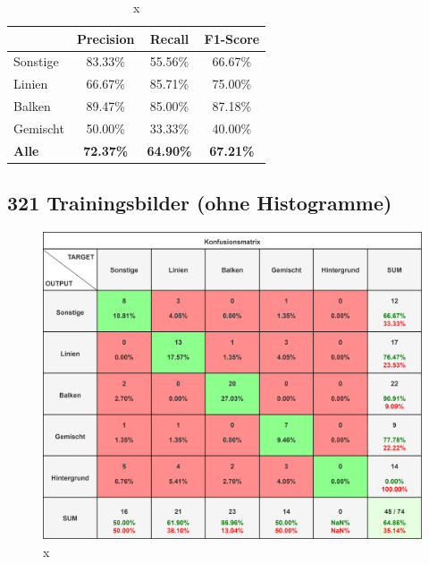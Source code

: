 \begin{table}[H]
    \centering
    \begin{tabular}{|l|c|c|c|}
        \hline
        \rowcolor[HTML]{EFEFEF}
                      & Precision        & Recall           & F1-Score         \\ \hline
        Sonstige      & 83.33\%          & 55.56\%          & 66.67\%          \\ \hline
        Linien        & 66.67\%          & 85.71\%          & 75.00\%          \\ \hline
        Balken        & 89.47\%          & 85.00\%          & 87.18\%          \\ \hline
        Gemischt      & 50.00\%          & 33.33\%          & 40.00\%          \\ \hline
        \textbf{Alle} & \textbf{72.37\%} & \textbf{64.90\%} & \textbf{67.21\%} \\ \hline
    \end{tabular}
    \caption{x}
\end{table}

\subsection*{321 Trainingsbilder (ohne Histogramme)}

\begin{figure}[H]
    \centering
    \captionsetup{width=1\linewidth}
    \includegraphics[width=1\textwidth]{Experimente/img/detect/3_val@0.653_nohisto/konfusionsmatrix.png}
    \caption{ x}
    \label{fig:extraction_output}
\end{figure}

